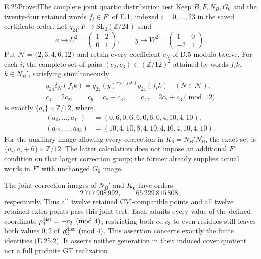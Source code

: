 \begin{statement}{E.25}{Proved}{The complete joint quartic distribution test}
Keep $B,F,N_B,G_6$ and the twenty-four retained words $f_i\in F'$
of E.1, indexed $i=0,\ldots,23$ in the saved certificate order.
Let $q_{24}:F\to\mathrm{SL}_2(\mathbb Z/24)$ send
\[
 x\longmapsto U^2=\begin{pmatrix}1&2\\0&1\end{pmatrix},
 \qquad y\longmapsto W^2=\begin{pmatrix}1&0\\-2&1\end{pmatrix}.
 \tag{E.25.1}
\]
Put $\mathcal N=\{2,3,4,6,12\}$ and retain every coefficient
$c_N$ of D.5 modulo twelve.  For each $i$, the complete set of
pairs $(c_2,c_3)\in(\mathbb Z/12)^2$ attained by words
$f_i k$, $k\in N_B'$, satisfying simultaneously
\[
\begin{gathered}
 q_{24}\delta_N(f_i k)=q_{24}(y)^{c_N(f_i k)}q_{24}(f_i k)
       \quad(N\in\mathcal N),\\
 c_4=2c_2,\qquad c_6=c_2+c_3,\qquad c_{12}=2c_2+c_3
       \pmod {12}
\end{gathered}
 \tag{E.25.2}
\]
is exactly $\{a_i\}\times\mathbb Z/12$, where
\[
\begin{aligned}
 (a_0,\ldots,a_{11})&=(0,6,0,6,6,0,6,0,4,10,4,10),\\
 (a_{12},\ldots,a_{23})&=(10,4,10,8,4,10,4,10,4,10,4,10).
\end{aligned}
 \tag{E.25.3}
\]
For the auxiliary image allowing every correction in
$K_6=N_B'N_B^6$, the exact set is
$\{a_i,a_i+6\}\times\mathbb Z/12$.
The latter calculation does not impose an additional $F'$ condition
on that larger correction group; the former already supplies actual
words in $F'$ with unchanged $G_6$ image.

The joint correction images of $N_B'$ and $K_6$ have orders
\[
             2\,717\,908\,992,
       \qquad65\,229\,815\,808,
 \tag{E.25.4}
\]
respectively.  Thus all twelve retained CM-compatible points and
all twelve retained extra points pass this joint test.  Each admits
every value of the defined coordinate $\rho_3^{\rm dist}=-c_3\pmod4$;
restricting both $c_2,c_3$ to even residues still leaves both
values $0,2$ of $\rho_3^{\rm dist}\pmod4$.
This assertion concerns exactly the finite identities (E.25.2).
It asserts neither generation in their induced cover quotient nor
a full profinite GT realization.
\end{statement}
